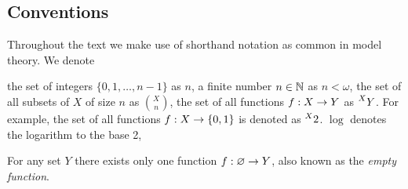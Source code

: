 





\setcounter{tocdepth}{3}
\tableofcontents


\subsection*{Conventions}
Throughout the text we make use of shorthand notation as common in model theory. We denote
\begin{outline}
    \1 the set of integers $\{0,1,\ldots,n-1\}$ as $n$, 
    \1 a finite number $n\in \mathbb{N}$ as $n<\omega$,
    \1 the set of all subsets of $X$ of size $n$ as $\binom{X}{n}$,
    \1 the set of all functions $f:X\rightarrow Y$ as $\prescript{X}{}{Y}$. 
    \0 For example, the set of all functions $f:X \rightarrow \{0,1\}$ is denoted as $\prescript{X}{}{2}$.
    \1 $\log$ denotes the logarithm to the base 2,
\end{outline}
For any set $Y$ there exists only one function $f:\varnothing\rightarrow Y$, also known as the \emph{empty function}.


